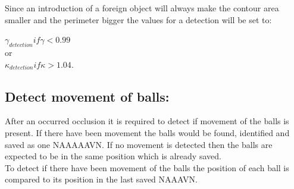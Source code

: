 Since an introduction of a foreign object will always make the contour area smaller and the perimeter bigger the values for a detection will be set to:

\begin{center}
$\gamma_{detection} if \gamma < 0.99$ \\
or\\
$\kappa_{detection} if \kappa > 1.04$.
\end{center}


\subsection{Detect movement of balls:}
After an occurred occlusion it is required to detect if movement of the balls is present. If there have been movement the balls would be found, identified and saved as one NAAAAAVN. If no movement is detected then the balls are expected to be in the same position which is already saved.\\

To detect if there have been movement of the balls the position of each ball is compared to its position in the last saved NAAAVN. 

